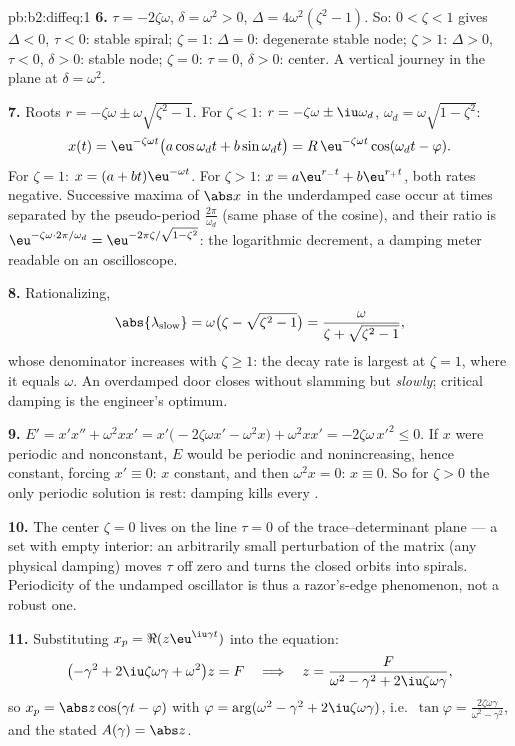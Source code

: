 \begin{solution}{pb:b2:diffeq:1}
\textbf{6.} $\tau = -2\zeta\omega$, $\delta = \omega^2 > 0$,
$\Delta = 4\omega^2(\zeta^2 - 1)$. So: $0 < \zeta < 1$ gives
$\Delta < 0$, $\tau < 0$: stable spiral; $\zeta = 1$: $\Delta =
0$: degenerate stable node; $\zeta > 1$: $\Delta > 0$, $\tau <
0$, $\delta > 0$: stable node; $\zeta = 0$: $\tau = 0$,
$\delta > 0$: center. A vertical journey in the plane at
$\delta = \omega^2$.

\textbf{7.} Roots $r = -\zeta\omega \pm
\omega\sqrt{\zeta^2-1}$. For $\zeta < 1$: $r = -\zeta\omega
\pm \iu\omega_d$, $\omega_d = \omega\sqrt{1-\zeta^2}$:
\[
x(t) = \eu^{-\zeta\omega t}\bigl(a\cos\omega_dt +
b\sin\omega_dt\bigr)
= R\,\eu^{-\zeta\omega t}\cos(\omega_dt - \varphi) .
\]
For $\zeta = 1$: $x = (a + bt)\eu^{-\omega t}$. For $\zeta >
1$: $x = a\eu^{r_-t} + b\eu^{r_+t}$, both rates negative.
Successive maxima of $\abs x$ in the underdamped case occur at
times separated by the pseudo-period $\frac{2\pi}{\omega_d}$
(same phase of the cosine), and their ratio is
$\eu^{-\zeta\omega\cdot2\pi/\omega_d} =
\eu^{-2\pi\zeta/\sqrt{1-\zeta^2}}$: the logarithmic decrement,
a damping meter readable on an oscilloscope.

\textbf{8.} Rationalizing,
\[
\abs{\lambda_{\mathrm{slow}}} = \omega\bigl(\zeta -
\sqrt{\zeta^2-1}\bigr)
= \frac{\omega}{\zeta + \sqrt{\zeta^2 - 1}} ,
\]
whose denominator increases with $\zeta \geq 1$: the decay
rate is largest at $\zeta = 1$, where it equals $\omega$. An
overdamped door closes without slamming but \emph{slowly};
critical damping is the engineer's optimum.

\textbf{9.} $E' = x'x'' + \omega^2xx' =
x'\bigl(-2\zeta\omega x' - \omega^2x\bigr) + \omega^2xx' =
-2\zeta\omega\,x'^2 \leq 0$. If $x$ were periodic and
nonconstant, $E$ would be periodic and nonincreasing, hence
constant, forcing $x' \equiv 0$: $x$ constant, and then
$\omega^2x = 0$: $x \equiv 0$. So for $\zeta > 0$ the only
periodic solution is rest: damping kills every .

\textbf{10.} The center $\zeta = 0$ lives on the line $\tau =
0$ of the trace--determinant plane --- a set with empty
interior: an arbitrarily small perturbation of the matrix
(any physical damping) moves $\tau$ off zero and turns the
closed orbits into spirals. Periodicity of the undamped
oscillator is thus a razor's-edge phenomenon, not a robust
one.

\textbf{11.} Substituting $x_p = \Re(z\eu^{\iu\gamma t})$ into
the equation:
\[
\bigl(-\gamma^2 + 2\iu\zeta\omega\gamma +
\omega^2\bigr)z = F
\quad\Longrightarrow\quad
z = \frac{F}{\omega^2 - \gamma^2 + 2\iu\zeta\omega\gamma},
\]
so $x_p = \abs z\cos(\gamma t - \varphi)$ with $\varphi =
\arg(\omega^2 - \gamma^2 + 2\iu\zeta\omega\gamma)$, i.e.\
$\tan\varphi = \frac{2\zeta\omega\gamma}{\omega^2 -
\gamma^2}$, and the stated $A(\gamma) = \abs z$.


\end{solution}
